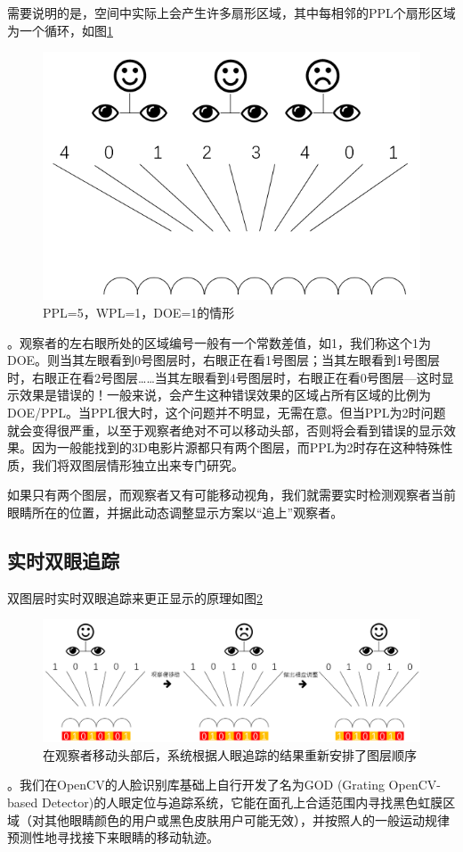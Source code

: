 \documentclass[12pt,a4paper]{article}
\begin{document}
需要说明的是，空间中实际上会产生许多扇形区域，其中每相邻的PPL个扇形区域为一个循环，如图\ref{7}%
\begin{figure}[htbp]
    \centering
    \includegraphics[width=0.6\linewidth]{7}
    \caption{PPL=5，WPL=1，DOE=1的情形}
    \label{7}
\end{figure}%
。观察者的左右眼所处的区域编号一般有一个常数差值，如1，我们称这个1为DOE。则当其左眼看到0号图层时，右眼正在看1号图层；当其左眼看到1号图层时，右眼正在看2号图层……当其左眼看到4号图层时，右眼正在看0号图层---这时显示效果是错误的！一般来说，会产生这种错误效果的区域占所有区域的比例为DOE/PPL。当PPL很大时，这个问题并不明显，无需在意。但当PPL为2时问题就会变得很严重，以至于观察者绝对不可以移动头部，否则将会看到错误的显示效果。因为一般能找到的3D电影片源都只有两个图层，而PPL为2时存在这种特殊性质，我们将双图层情形独立出来专门研究。

如果只有两个图层，而观察者又有可能移动视角，我们就需要实时检测观察者当前眼睛所在的位置，并据此动态调整显示方案以“追上”观察者。

\subsection{实时双眼追踪}

双图层时实时双眼追踪来更正显示的原理如图\ref{8}%
\begin{figure}[htbp]
    \centering
    \includegraphics[width=\linewidth]{8}
    \caption{在观察者移动头部后，系统根据人眼追踪的结果重新安排了图层顺序}
    \label{8}
\end{figure}%
。我们在OpenCV的人脸识别库基础上自行开发了名为GOD (Grating OpenCV-based Detector)的人眼定位与追踪系统，它能在面孔上合适范围内寻找黑色虹膜区域（对其他眼睛颜色的用户或黑色皮肤用户可能无效），并按照人的一般运动规律预测性地寻找接下来眼睛的移动轨迹。
\end{document}
